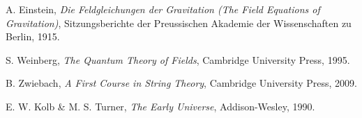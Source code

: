 \documentclass[12pt]{article}
\begin{document}
\vspace{1em}

\begin{thebibliography}{9}

A. Einstein,
\textit{Die Feldgleichungen der Gravitation (The Field Equations of Gravitation)}, 
Sitzungsberichte der Preussischen Akademie der Wissenschaften zu Berlin, 1915.

S. Weinberg,
\textit{The Quantum Theory of Fields}, 
Cambridge University Press, 1995.

B. Zwiebach,
\textit{A First Course in String Theory}, 
Cambridge University Press, 2009.

E. W. Kolb \& M. S. Turner,
\textit{The Early Universe},
Addison-Wesley, 1990.

\end{thebibliography}
\end{document}
